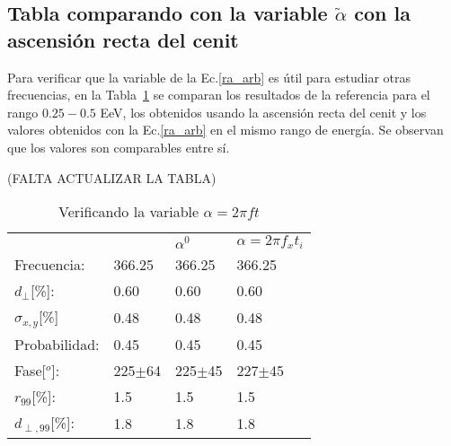\subsection{Tabla comparando con la variable $\tilde{\alpha}$ con la ascensión recta del cenit }

Para verificar que la variable de la Ec.\ref{ra_arb} es útil para estudiar otras frecuencias, en la Tabla~\ref{tab:comp_vars} se comparan los resultados de la referencia para el rango $0.25-0.5$ EeV, los obtenidos usando la ascensión recta del cenit y los valores obtenidos con la Ec.\ref{ra_arb} en el mismo rango de energía. Se observan que los valores son comparables entre sí.

(FALTA ACTUALIZAR LA TABLA)
\begin{table}[H]
    \begin{small}
        \begin{center}
            \begin{tabular}[c]{l|l|l|l}
                                    & \cite{Aab_2020} & $\alpha^0$   & $\alpha=2\pi f_xt_i$   \\ 
                Frecuencia:         & 366.25          &  366.25      &  366.25            \\
                $d_\perp$[\%]:      & 0.60            &  0.60        &  0.60              \\
                $\sigma_{x,y}$[\%]  & 0.48            &  0.48        &  0.48              \\ 
                Probabilidad:       & 0.45            &  0.45        &  0.45              \\
                Fase[$^o$]:         & 225$\pm$64\cite{discrepancia} & 225$\pm$45   &  227$\pm$45          \\
                $r_{99}$[\%]:       & 1.5             &  1.5       &  1.5             \\
                $d_{\perp,99}$[\%]: & 1.8             &  1.8       &  1.8             \\
            \end{tabular}
        \end{center}
        \caption{Verificando la  variable $\alpha=2\pi ft$}
        \label{tab:comp_vars}
    \end{small}
\end{table}

